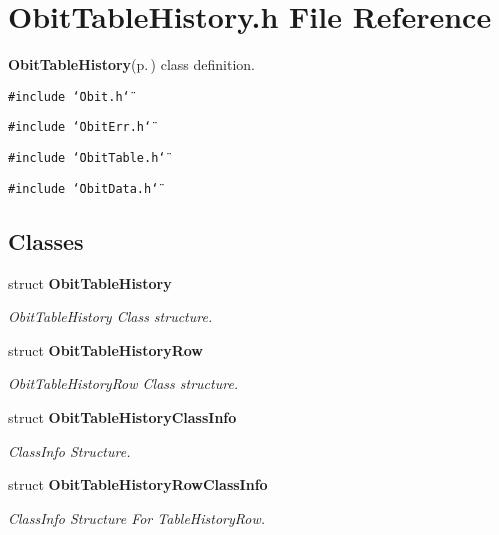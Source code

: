 \section{Obit\-Table\-History.h File Reference}
\label{ObitTableHistory_8h}
{\bf Obit\-Table\-History}{\rm (p.\,\pageref{structObitTableHistory})} class definition. 

{\tt \#include \char`\"{}Obit.h\char`\"{}}\par
{\tt \#include \char`\"{}Obit\-Err.h\char`\"{}}\par
{\tt \#include \char`\"{}Obit\-Table.h\char`\"{}}\par
{\tt \#include \char`\"{}Obit\-Data.h\char`\"{}}\par
\subsection*{Classes}
\begin{CompactItemize}
\item 
struct {\bf Obit\-Table\-History}
\begin{CompactList}\small\item\em Obit\-Table\-History Class structure. \item\end{CompactList}\item 
struct {\bf Obit\-Table\-History\-Row}
\begin{CompactList}\small\item\em Obit\-Table\-History\-Row Class structure. \item\end{CompactList}\item 
struct {\bf Obit\-Table\-History\-Class\-Info}
\begin{CompactList}\small\item\em Class\-Info Structure. \item\end{CompactList}\item 
struct {\bf Obit\-Table\-History\-Row\-Class\-Info}
\begin{CompactList}\small\item\em Class\-Info Structure For Table\-History\-Row. \item\end{CompactList}\end{CompactItemize}
